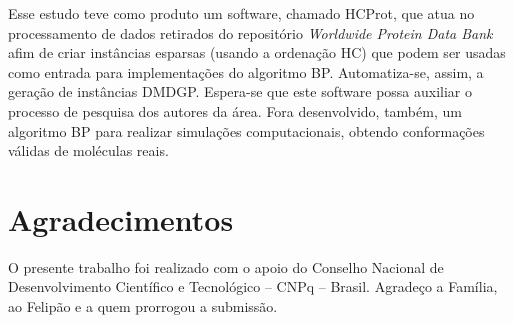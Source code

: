 \documentclass[a4,11pt]{pssbmac}
\begin{document}
	Esse estudo teve como produto um software, chamado HCProt, que atua no processamento de dados retirados do repositório \textit{Worldwide Protein Data Bank} afim de criar instâncias esparsas (usando a ordenação HC) que podem ser usadas como entrada para implementações do algoritmo BP.  Automatiza-se, assim, a geração de instâncias DMDGP. Espera-se que este software possa auxiliar o processo de pesquisa dos autores da área. Fora desenvolvido, também,  um algoritmo BP para realizar simulações computacionais, obtendo conformações válidas de moléculas reais.
	
	\vspace{-0.14cm}
	\section*{Agradecimentos}
	O presente trabalho foi realizado com o apoio do Conselho Nacional de Desenvolvimento Científico e Tecnológico – CNPq – Brasil. Agradeço a Família, ao Felipão e a quem prorrogou a submissão.
	
\end{document}
